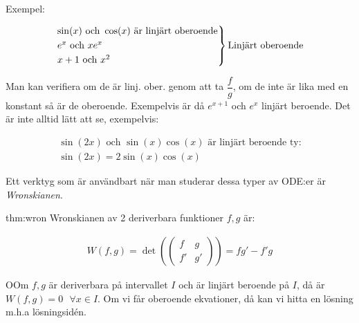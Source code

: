 \noindent Exempel:


\begin{equation*}
  \begin{gathered}
    \begin{rcases*}
      \sin(x) \text{ och } \cos(x) \text{ är linjärt oberoende}\\
      e^x \text{ och } xe^x\\
      x+1 \text{ och } x^2
    \end{rcases*}\text{Linjärt oberoende}
  \end{gathered}
\end{equation*}
\par\bigskip

\noindent Man kan verifiera om de är linj. ober. genom att ta $\dfrac{f}{g}$, om de inte är lika med en konstant så är de oberoende. Exempelvis är då $e^{x+1}$ och $e^x$ linjärt beroende. Det är inte alltid lätt att se, exempelvis:


\begin{equation*}
  \begin{gathered}
    \sin(2x) \text{ och } \sin(x)\cos(x) \text{ är linjärt beroende ty:}\\
    \sin(2x)=2\sin(x)\cos(x)
  \end{gathered}
\end{equation*}
\par\bigskip

\noindent Ett verktyg som är användbart när man studerar dessa typer av ODE:er är \textit{Wronskianen}.
\par\bigskip

\begin{theo}[Wronskianen]{thm:wron}
  Wronskianen av 2 deriverbara funktioner $f,g$ är:


  \begin{equation*}
    \begin{gathered}
      W(f,g)= \det(\begin{pmatrix}f&g\\f'&g'\end{pmatrix}) = fg'-f'g
    \end{gathered}
  \end{equation*}
\end{theo}
\par\bigskip

\begin{lem}
  OOm $f,g$ är deriverbara på intervallet $I$ och är linjärt beroende på $I$, då är $W(f,g)=0 \text{  } \forall x\in I$. Om vi får oberoende ekvationer, då kan vi hitta en lösning m.h.a lösningsidén.
\end{lem}
\par\bigskip

